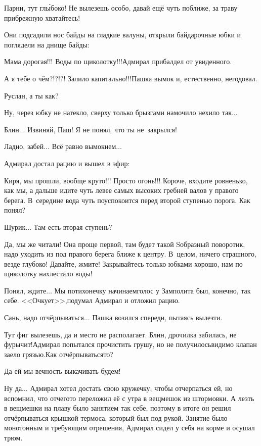 \diagdash Парни, тут гл{\'ы}боко! Не вылезешь особо, давай ещё чуть поближе, за траву прибрежную хватайтесь!

Они подсадили нос байды на гладкие валуны, открыли байдарочные юбки и поглядели на днище байды:

\diagdash Мама дорогая!!! Воды по щиколотку!!!\mdash Адмирал прибалдел от увиденного.

\diagdash А я тебе о чём?!?!?! Залило капитально!!!\mdash Пашка вымок и, естественно, негодовал.
 
\diagdash Руслан, а ты как?

\diagdash Ну, через юбку не натекло, сверху только брызгами намочило нехило так$\ldots$

\diagdash Блин$\ldots$ Извиняй, Паш! Я не понял, что ты не~закрылся!

\diagdash Ладно, забей$\ldots$ Всё равно вымокнем$\ldots$

Адмирал достал рацию и вышел в эфир:

\diagdash Киря, мы прошли, вообще круто!!! Просто огонь!!! Короче, входите ровненько, как мы, а дальше идите чуть левее самых высоких гребней валов у правого берега. В~середине вода чуть поуспокоится перед второй ступенью порога. Как понял?

\diagdash Шурик$\ldots$ Там есть вторая ступень?

\diagdash Да, мы же читали! Она проще первой, там будет такой S\sdash образный поворотик, надо уходить из под правого берега ближе к центру. В~целом, ничего страшного, везде глубоко! Давайте, жмите! Закрывайтесь только юбками хорошо, нам по щиколотку нахлестало воды!

\diagdash Понял, ждите$\ldots$ Мы потихонечку начинаем\mdash голос у Замполита был, конечно, так себе. <<Очкует>>,\mdash подумал Адмирал и отложил рацию.

\diagdash Сань, надо отчёрпываться$\ldots$ \mdash Пашка возился спереди, пытаясь вылезти.

\diagdash Тут фиг вылезешь, да и место не располагает. Блин, дрочилка забилась, не фурычит!\mdash Адмирал попытался прочистить грушу, но не получилось\mdash видимо клапан заело грязью.\mdash Как отчёрпываться\sdash то?

\diagdash Да ей мы вечность выкачивать будем!

\diagdash Ну да$\ldots$ \mdash Адмирал хотел достать свою кружечку, чтобы отчерпаться ей, но вспомнил, что отчего\sdash то переложил её с утра в вещмешок из штормовки. А лезть в вещмешки на плаву было занятием так себе, поэтому в итоге он решил отчёрпываться крышкой термоса, который был под рукой. Занятие было монотонным и требующим отрешения, Адмирал сидел у себя на корме и осушал трюм.

